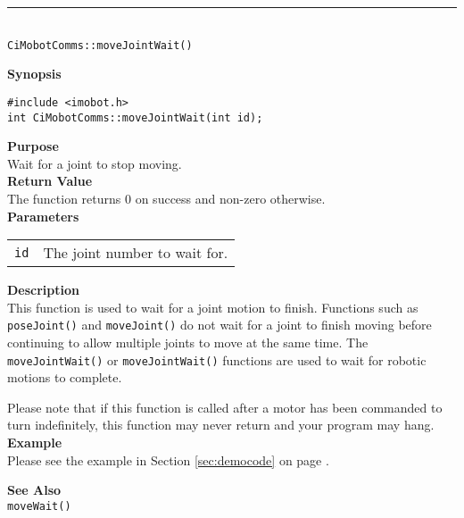 \noindent
\vspace{5pt}
\rule{4.5in}{0.015in}\\
\noindent
{\LARGE \texttt{CiMobotComms::moveJointWait()}}\\
{}

\noindent
{\bf Synopsis}\\
\begin{verbatim}
#include <imobot.h>
int CiMobotComms::moveJointWait(int id);
\end{verbatim}

\noindent
{\bf Purpose}\\
Wait for a joint to stop moving.\\

\noindent
{\bf Return Value}\\
The function returns 0 on success and non-zero otherwise.\\

\noindent
{\bf Parameters}
\vspace{-0.1in}
\begin{description}
\item               
\begin{tabular}{p{10 mm}p{145 mm}}
\texttt{id} & The joint number to wait for. \\
\end{tabular}
\end{description}

\noindent
{\bf Description}\\
This function is used to wait for a joint motion to finish. Functions such as
\texttt{poseJoint()} and \texttt{moveJoint()} do not wait for a joint to finish
moving before continuing to allow multiple joints to move at the same time. The
\texttt{moveJointWait()} or \texttt{moveJointWait()} functions are used to wait for
robotic motions to complete.

Please note that if this function is called after a motor has been commanded to
turn indefinitely, this function may never return and your program may hang.\\

\noindent
{\bf Example}\\
Please see the example in Section \ref{sec:democode} on page \pageref{sec:democode}.\\
\noindent

\noindent
{\bf See Also}\\
\texttt{moveWait()}


